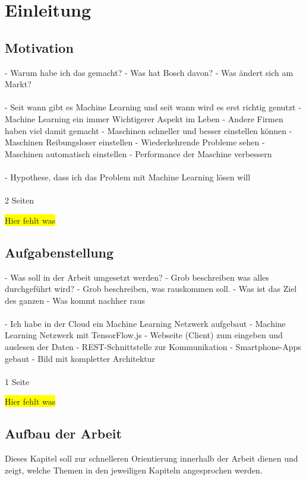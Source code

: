 \chapter{Einleitung}
\label{ch:einleitung}

\section{Motivation}
\label{sec:motivation}
- Warum habe ich das gemacht?
- Was hat Bosch davon?
- Was ändert sich am Markt?
\\ \\
- Seit wann gibt es Machine Learning und seit wann wird es erst richtig genutzt
- Machine Learning ein immer Wichtigerer Aspekt im Leben
- Andere Firmen haben viel damit gemacht
- Maschinen schneller und besser einstellen können
- Maschinen Reibungsloser einstellen
- Wiederkehrende Probleme sehen
- Maschinen automatisch einstellen
- Performance der Maschine verbessern
\\ \\
- Hypothese, dass ich das Problem mit Machine Learning lösen will
\\ \\
2 Seiten

\colorbox{yellow}{Hier fehlt was}

\section{Aufgabenstellung}
\label{sec:aufgabenstellung}
- Was soll in der Arbeit umgesetzt werden?
- Grob beschreiben was alles durchgeführt wird?
- Grob beschreiben, was rauskommen soll.
- Was ist das Ziel des ganzen
- Was kommt nachher raus
\\ \\
- Ich habe in der Cloud ein Machine Learning Netzwerk aufgebaut
- Machine Learning Netzwerk mit TensorFlow.js
- Webseite (Client) zum eingeben und auslesen der Daten
- REST-Schnittstelle zur Kommunikation
- Smartphone-Apps gebaut
- Bild mit kompletter Architektur
\\ \\
1 Seite

\colorbox{yellow}{Hier fehlt was}

\newpage

\section{Aufbau der Arbeit}
\label{sec:aufbauDerArbeit}
Dieses Kapitel soll zur schnelleren Orientierung innerhalb der Arbeit dienen und zeigt, welche Themen in den jeweiligen
Kapiteln angesprochen werden.

